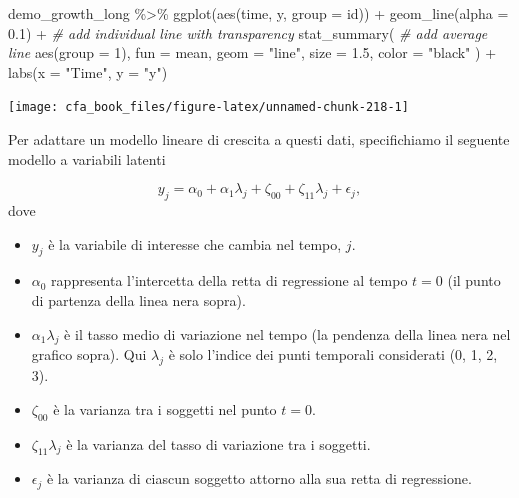 \documentclass[
  11pt,
]{krantz}
\makeatletter
\newenvironment{Shaded}{\begin{snugshade}}{\end{snugshade}}
\newcommand{\AttributeTok}[1]{\textcolor[rgb]{0.61,0.61,0.61}{#1}}
\newcommand{\CommentTok}[1]{\textcolor[rgb]{0.37,0.37,0.37}{\textit{#1}}}
\newcommand{\DecValTok}[1]{\textcolor[rgb]{0.06,0.06,0.06}{#1}}
\newcommand{\FloatTok}[1]{\textcolor[rgb]{0.06,0.06,0.06}{#1}}
\newcommand{\FunctionTok}[1]{\textcolor[rgb]{0,0,0}{#1}}
\newcommand{\NormalTok}[1]{#1}
\newcommand{\SpecialCharTok}[1]{\textcolor[rgb]{0,0,0}{#1}}
\newcommand{\StringTok}[1]{\textcolor[rgb]{0.5,0.5,0.5}{#1}}
\providecommand{\tightlist}{%
  \setlength{\itemsep}{0pt}\setlength{\parskip}{0pt}}
\newenvironment{kframe}{%
\medskip{}
\setlength{\fboxsep}{.8em}
 \def\at@end@of@kframe{}%
 \ifinner\ifhmode%
  \def\at@end@of@kframe{\end{minipage}}%
  \begin{minipage}{\columnwidth}%
 \fi\fi%
 \def\FrameCommand##1{\hskip\@totalleftmargin \hskip-\fboxsep
 \colorbox{shadecolor}{##1}\hskip-\fboxsep
     \hskip-\linewidth \hskip-\@totalleftmargin \hskip\columnwidth}%
 \MakeFramed {\advance\hsize-\width
   \@totalleftmargin\z@ \linewidth\hsize
   \@setminipage}}%
 {\par\unskip\endMakeFramed%
 \at@end@of@kframe}
\renewenvironment{Shaded}{\begin{kframe}}{\end{kframe}}
\theoremstyle{definition}
\theoremstyle{definition}
\theoremstyle{definition}
\theoremstyle{definition}
\theoremstyle{remark}
\makeatother
\begin{document}
\begin{Shaded}
\begin{Highlighting}[]
\NormalTok{demo\_growth\_long }\SpecialCharTok{\%\textgreater{}\%}
  \FunctionTok{ggplot}\NormalTok{(}\FunctionTok{aes}\NormalTok{(time, y, }\AttributeTok{group =}\NormalTok{ id)) }\SpecialCharTok{+}
  \FunctionTok{geom\_line}\NormalTok{(}\AttributeTok{alpha =} \FloatTok{0.1}\NormalTok{) }\SpecialCharTok{+} \CommentTok{\# add individual line with transparency}
  \FunctionTok{stat\_summary}\NormalTok{( }\CommentTok{\# add average line}
    \FunctionTok{aes}\NormalTok{(}\AttributeTok{group =} \DecValTok{1}\NormalTok{),}
    \AttributeTok{fun =}\NormalTok{ mean,}
    \AttributeTok{geom =} \StringTok{"line"}\NormalTok{,}
    \AttributeTok{size =} \FloatTok{1.5}\NormalTok{,}
    \AttributeTok{color =} \StringTok{"black"}
\NormalTok{  ) }\SpecialCharTok{+}
  \FunctionTok{labs}\NormalTok{(}\AttributeTok{x =} \StringTok{"Time"}\NormalTok{, }\AttributeTok{y =} \StringTok{"y"}\NormalTok{)}
\end{Highlighting}
\end{Shaded}

\begin{center}\texttt{[image: cfa\_book\_files/figure-latex/unnamed-chunk-218-1]} \end{center}

Per adattare un modello lineare di crescita a questi dati, specifichiamo il seguente modello a variabili latenti

\[
y_j = \alpha_0 + \alpha_1 \lambda_j + \zeta_{00} + \zeta_{11} \lambda_j + \epsilon_j,
\] dove

\begin{itemize}
\tightlist
\item
  \(y_j\) è la variabile di interesse che cambia nel tempo, \(j\).
\item
  \(\alpha_0\) rappresenta l'intercetta della retta di regressione al tempo \(t = 0\) (il punto di partenza della linea nera sopra).
\item
  \(\alpha_1 \lambda_j\) è il tasso medio di variazione nel tempo (la pendenza della linea nera nel grafico sopra). Qui \(\lambda_j\) è solo l'indice dei punti temporali considerati (0, 1, 2, 3).
\item
  \(\zeta_{00}\) è la varianza tra i soggetti nel punto \(t = 0\).
\item
  \(\zeta_{11} \lambda_j\) è la varianza del tasso di variazione tra i soggetti.
\item
  \(\epsilon_j\) è la varianza di ciascun soggetto attorno alla sua retta di regressione.
\end{itemize}
\end{document}
